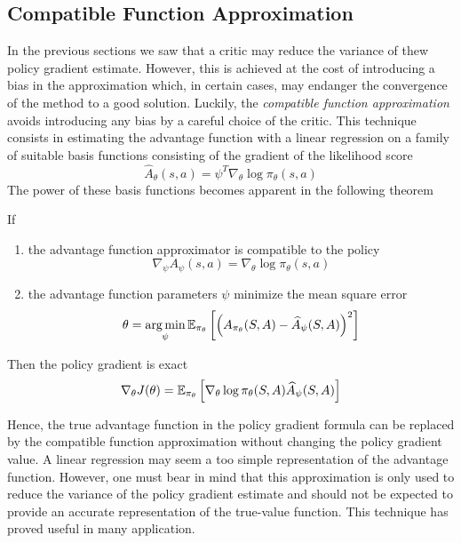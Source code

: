 \subsection{Compatible Function Approximation}
In the previous sections we saw that a critic may reduce the variance of thew policy gradient estimate. However, this is achieved at the cost of introducing a bias in the approximation which, in certain cases, may endanger the convergence of the method to a good solution. Luckily, the \emph{compatible function approximation}  \cite{sutton1999policy} avoids introducing any bias by a careful choice of the critic. This technique consists in estimating the advantage function with a linear regression on a family of suitable basis functions consisting of the gradient of the likelihood score
\begin{equation}
	\widehat{A}_\theta (s,a) = \psi^T \nabla_\theta \log \pi_\theta(s,a)
\end{equation}
The power of these basis functions becomes apparent in the following theorem
\begin{theorem}
	If 
	\begin{enumerate}[label={\roman*)}]
		\item the advantage function approximator is compatible to the policy
		\begin{equation}
			\nabla_\psi A_\psi(s,a) = \nabla_\theta \log \pi_\theta(s,a)
		\end{equation}
		\item the advantage function parameters $\psi$ minimize the mean square error 
		\begin{equation}
			\theta = \argmin_\psi \E[\pi_\theta]{\left( A_{\pi_\theta}(S,A) - \widehat{A}_\psi(S,A)\right)^2}
		\end{equation}
	\end{enumerate}
	Then the policy gradient is exact
	\begin{equation}
		\nabla_\theta J(\theta) = \E[\pi_\theta]{\nabla_\theta \log \pi_\theta(S,A) \widehat{A}_\psi(S,A)}
	\end{equation}
\end{theorem} 
Hence, the true advantage function in the policy gradient formula can be replaced by the compatible function approximation without changing the policy gradient value. A linear regression may seem a too simple representation of the advantage function. However, one must bear in mind that this approximation is only used to reduce the variance of the policy gradient estimate and should not be expected to provide an accurate representation of the true-value function. This technique has proved useful in many application. 

